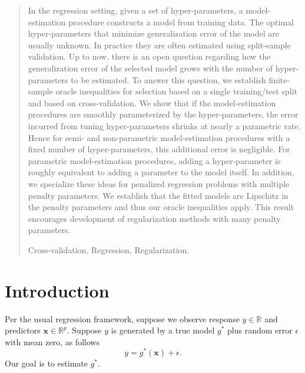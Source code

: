 \documentclass[12pt]{article} %
\renewcommand{\theequation}{\thesection\arabic{equation}}
\theoremstyle{definition}
\begin{document}
\begin{quotation}
In the regression setting, given a set of hyper-parameters, a model-estimation procedure constructs a model from training data. The optimal hyper-parameters that minimize generalization error of the model are usually unknown. In practice they are often estimated using split-sample validation. Up to now, there is an open question regarding how the generalization error of the selected model grows with the number of hyper-parameters to be estimated. To answer this question, we establish finite-sample oracle inequalities for selection based on a single training/test split and based on cross-validation. We show that if the model-estimation procedures are smoothly parameterized by the hyper-parameters, the error incurred from tuning hyper-parameters shrinks at nearly a parametric rate. Hence for semi- and non-parametric model-estimation procedures with a fixed number of hyper-parameters, this additional error is negligible. For parametric model-estimation procedures, adding a hyper-parameter is roughly equivalent to adding a parameter to the model itself. In addition, we specialize these ideas for penalized regression problems with multiple penalty parameters. We establish that the fitted models are Lipschitz in the penalty parameters and thus our oracle inequalities apply. This result encourages development of regularization methods with many penalty parameters.
\vspace{9pt}

Cross-validation, Regression, Regularization.
\par
\end{quotation}\par

\def\thefigure{\arabic{figure}}
\def\thetable{\arabic{table}}

\renewcommand{\theequation}{\thesection.\arabic{equation}}



\fontsize{12}{14pt plus.8pt minus .6pt}\selectfont

\setcounter{section}{1} %
\setcounter{equation}{0} %

\section{Introduction}


Per the usual regression framework, suppose we observe response $y \in \mathbb{R}$ and predictors $\boldsymbol {x} \in \mathbb{R}^p$. Suppose $y$ is generated by a true model $g^*$ plus random error $\epsilon$ with mean zero, as follows
\begin{equation}
\label{true_model}
y = g^*(\boldsymbol x) + \epsilon.
\end{equation}
Our goal is to estimate $g^*$.
\end{document}
